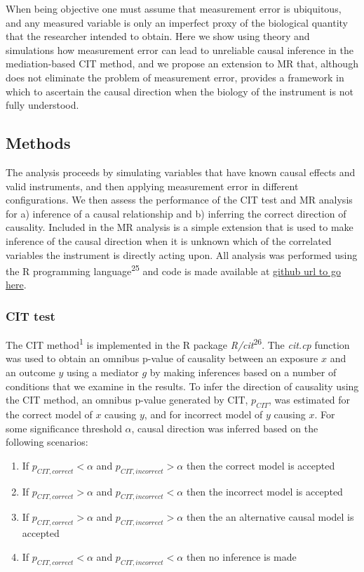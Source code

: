 \documentclass[]{article}
\begin{document}
When being objective one must assume that measurement error is
ubiquitous, and any measured variable is only an imperfect proxy of the
biological quantity that the researcher intended to obtain. Here we show
using theory and simulations how measurement error can lead to
unreliable causal inference in the mediation-based CIT method, and we
propose an extension to MR that, although does not eliminate the problem
of measurement error, provides a framework in which to ascertain the
causal direction when the biology of the instrument is not fully
understood.

\subsection{Methods}\label{methods}

The analysis proceeds by simulating variables that have known causal
effects and valid instruments, and then applying measurement error in
different configurations. We then assess the performance of the CIT test
and MR analysis for a) inference of a causal relationship and b)
inferring the correct direction of causality. Included in the MR
analysis is a simple extension that is used to make inference of the
causal direction when it is unknown which of the correlated variables
the instrument is directly acting upon. All analysis was performed using
the R programming language\textsuperscript{25} and code is made
available at \href{}{github url to go here}.

\subsubsection{CIT test}\label{cit-test}

The CIT method\textsuperscript{1} is implemented in the R package
\emph{R/cit}\textsuperscript{26}. The \emph{cit.cp} function was used to
obtain an omnibus p-value of causality between an exposure \(x\) and an
outcome \(y\) using a mediator \(g\) by making inferences based on a
number of conditions that we examine in the results. To infer the
direction of causality using the CIT method, an omnibus p-value
generated by CIT, \(p_{CIT}\), was estimated for the correct model of
\(x\) causing \(y\), and for incorrect model of \(y\) causing \(x\). For
some significance threshold \(\alpha\), causal direction was inferred
based on the following scenarios:

\begin{enumerate}
\def\labelenumi{\arabic{enumi}.}
\itemsep1pt\parskip0pt
\item
  If \(p_{CIT,correct} < \alpha\) and \(p_{CIT,incorrect} > \alpha\)
  then the correct model is accepted
\item
  If \(p_{CIT,correct} > \alpha\) and \(p_{CIT,incorrect} < \alpha\)
  then the incorrect model is accepted
\item
  If \(p_{CIT,correct} > \alpha\) and \(p_{CIT,incorrect} > \alpha\)
  then the an alternative causal model is accepted
\item
  If \(p_{CIT,correct} < \alpha\) and \(p_{CIT,incorrect} < \alpha\)
  then no inference is made
\end{enumerate}
\end{document}
